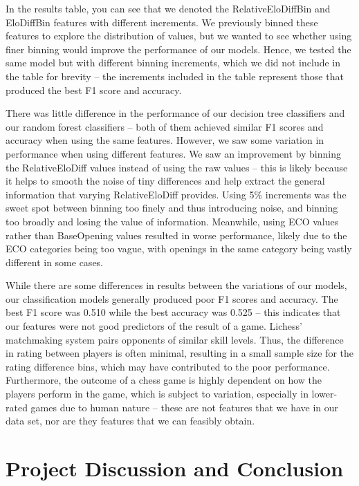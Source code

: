 \documentclass[a4paper, 11pt]{article}
\begin{document}
In the results table, you can see that we denoted the RelativeEloDiffBin and EloDiffBin features with different increments. We previously binned these features to explore the distribution of values, but we wanted to see whether using finer binning would improve the performance of our models. Hence, we tested the same model but with different binning increments, which we did not include in the table for brevity -- the increments included in the table represent those that produced the best F1 score and accuracy.

There was little difference in the performance of our decision tree classifiers and our random forest classifiers -- both of them achieved similar F1 scores and accuracy when using the same features. However, we saw some variation in performance when using different features. We saw an improvement by binning the RelativeEloDiff values instead of using the raw values -- this is likely because it helps to smooth the noise of tiny differences and help extract the general information that varying RelativeEloDiff provides. Using 5\% increments was the sweet spot between binning too finely and thus introducing noise, and binning too broadly and losing the value of information. Meanwhile, using ECO values rather than BaseOpening values resulted in worse performance, likely due to the ECO categories being too vague, with openings in the same category being vastly different in some cases.

While there are some differences in results between the variations of our models, our classification models generally produced poor F1 scores and accuracy. The best F1 score was 0.510 while the best accuracy was 0.525 -- this indicates that our features were not good predictors of the result of a game. Lichess' matchmaking system pairs opponents of similar skill levels. Thus, the difference in rating between players is often minimal, resulting in a small sample size for the rating difference bins, which may have contributed to the poor performance. Furthermore, the outcome of a chess game is highly dependent on how the players perform in the game, which is subject to variation, especially in lower-rated games due to human nature -- these are not features that we have in our data set, nor are they features that we can feasibly obtain. 

\section{Project Discussion and Conclusion}
\end{document}
